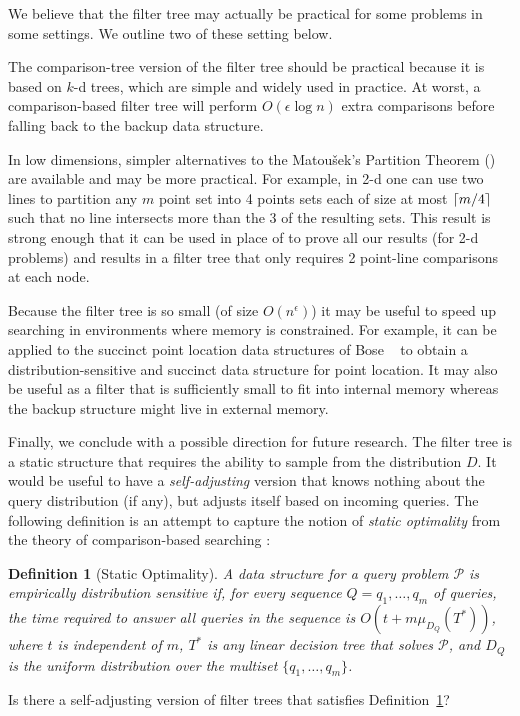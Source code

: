 \documentclass{patmorin}
\newtheorem{defn}{Definition}
\begin{document}
We believe that the filter tree may actually be practical for some
problems in some settings.  We outline two of these setting below.

The comparison-tree version of the filter tree should be practical
because it is based on $k$-d trees, which are simple and widely used
in practice. At worst, a comparison-based filter tree will perform
$O(\epsilon\log n)$ extra comparisons before falling back to the backup
data structure.

In low dimensions, simpler alternatives to the Matou\v{s}ek's Partition
Theorem () are available and may be more
practical.  For example, in 2-d one can use two lines to partition any $m$
point set into 4 points sets each of size at most ${\left\lceil m/4 \right\rceil}$ such that
no line intersects more than the 3 of the resulting sets. This result is
strong enough that it can be used in place of 
to prove all our results (for 2-d problems) and results in a filter tree
that only requires 2 point-line comparisons at each node.

Because the filter tree is so small (of size $O(n^\epsilon)$) it
may be useful to speed up searching in environments where memory
is constrained. For example, it can be applied to the succinct
point location data structures of Bose \etal\ \cite{bchmm09} to obtain a
distribution-sensitive and succinct data structure for point location.
It may also be useful as a filter that is sufficiently small to fit
into internal memory whereas the backup structure might live in external
memory.

Finally, we conclude with a possible direction for future research.  The
filter tree is a static structure that requires the ability to sample from
the distribution $D$.  It would be useful to have a \emph{self-adjusting}
version that knows nothing about the query distribution (if any), but
adjusts itself based on incoming queries.   The following definition
is an attempt to capture the notion of \emph{static optimality} from the theory
of comparison-based searching \cite{st85}:

\begin{defn}[Static Optimality]\label{defn:static-optimality}
A data structure for a query problem $\mathcal{P}$ is \emph{empirically
distribution sensitive} if, for every sequence $Q=q_1,\ldots,q_m$
of queries, the time required to answer all queries in the sequence
is $O(t + m\mu_{D_Q}(T^*))$, where $t$ is independent of $m$, $T^*$
is any linear decision tree that solves $\mathcal{P}$, and $D_{Q}$
is the uniform distribution over the multiset $\{q_1,\ldots,q_m\}$.
\end{defn}
Is there a self-adjusting version of filter trees that satisfies
Definition~\ref{defn:static-optimality}?





\end{document}

